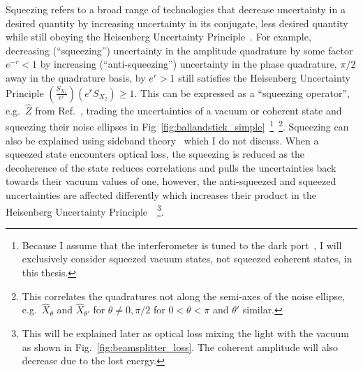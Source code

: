 Squeezing refers to a broad range of technologies that decrease uncertainty in a desired quantity by increasing uncertainty in its conjugate, less desired quantity while still obeying the Heisenberg Uncertainty Principle~\cite{}. For example, decreasing (``squeezing'') uncertainty in the amplitude quadrature by some factor $e^{-r}<1$ by increasing (``anti-squeezing'') uncertainty in the phase quadrature, $\pi/2$ away in the quadrature basis, by $e^r>1$ still satisfies the Heisenberg Uncertainty Principle $(\frac{S_{X_1}}{e^r}) (e^rS_{X_2})\geq1$. 
This can be expressed as a ``squeezing operator'', e.g.\ $\hat Z$ from Ref.~\cite{}, trading the uncertainties of a vacuum or coherent state and squeezing their noise ellipses in Fig~\ref{fig:ballandstick_simple}~\footnote{Because I assume that the interferometer is tuned to the dark port~\cite{}, I will exclusively consider squeezed vacuum states, not squeezed coherent states, in this thesis. }~\footnote{This correlates the quadratures not along the semi-axes of the noise ellipse, e.g.\ $\hat{X}_\theta$ and $\hat{X}_{\theta'}$ for $\theta\neq0,\pi/2$ for $0<\theta<\pi$ and $\theta'$ similar.}.
Squeezing can also be explained using sideband theory~\cite{} which I do not discuss.
When a squeezed state encounters optical loss, the squeezing is reduced as the decoherence of the state reduces correlations and pulls the uncertainties back towards their vacuum values of one, however, the anti-squeezed and squeezed uncertainties are affected differently which increases their product in the Heisenberg Uncertainty Principle~\cite{}~\footnote{This will be explained later as optical loss mixing the light with the vacuum as shown in Fig.~\ref{fig:beamsplitter_loss}. The coherent amplitude will also decrease due to the lost energy. }. %

